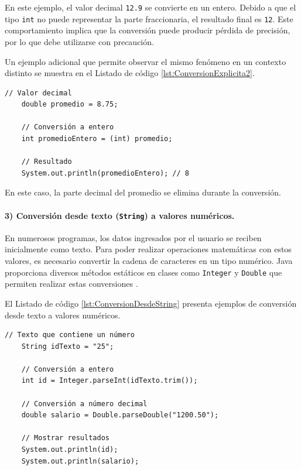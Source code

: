 \documentclass[12pt,twoside]{book}
\begin{document}
						\noindent
						En este ejemplo, el valor decimal \texttt{12.9} se convierte en un entero. Debido a que el tipo \texttt{int} no puede representar la parte fraccionaria, el resultado final es \texttt{12}. Este comportamiento implica que la conversión puede producir pérdida de precisión, por lo que debe utilizarse con precaución.
						
						Un ejemplo adicional que permite observar el mismo fenómeno en un contexto distinto se muestra en el Listado de código \ref{lst:ConversionExplicita2}.
						
						\begin{lstlisting}[style=Java,caption={Otro ejemplo de conversión con pérdida de precisión.},label={lst:ConversionExplicita2}]
	// Valor decimal
	double promedio = 8.75;
	
	// Conversión a entero
	int promedioEntero = (int) promedio;
	
	// Resultado
	System.out.println(promedioEntero); // 8 \end{lstlisting}
						
						\noindent
						En este caso, la parte decimal del promedio se elimina durante la conversión.
						
						\paragraph{3) Conversión desde texto (\texttt{String}) a valores numéricos.}
						En numerosos programas, los datos ingresados por el usuario se reciben inicialmente como texto. Para poder realizar operaciones matemáticas con estos valores, es necesario convertir la cadena de caracteres en un tipo numérico. Java proporciona diversos métodos estáticos en clases como \texttt{Integer} y \texttt{Double} que permiten realizar estas conversiones \cite{Deitel2025Java}.
						
						El Listado de código \ref{lst:ConversionDesdeString} presenta ejemplos de conversión desde texto a valores numéricos.
						
						\begin{lstlisting}[style=Java,caption={Conversión desde String a valores numéricos.},label={lst:ConversionDesdeString}]
	// Texto que contiene un número
	String idTexto = "25";
	
	// Conversión a entero
	int id = Integer.parseInt(idTexto.trim());
	
	// Conversión a número decimal
	double salario = Double.parseDouble("1200.50");
	
	// Mostrar resultados
	System.out.println(id);
	System.out.println(salario); \end{lstlisting}
						
\end{document}
